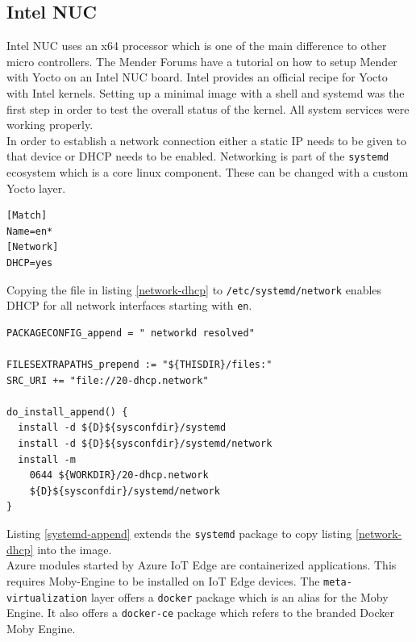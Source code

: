 \subsection{Intel NUC}
Intel NUC uses an x64 processor which is one of the main difference to other micro controllers. The Mender Forums have a tutorial on how to setup Mender with Yocto on an Intel NUC board.\cite{intel-mender-yocto} Intel provides an official recipe for Yocto with Intel kernels. Setting up a minimal image with a shell and systemd was the first step in order to test the overall status of the kernel. All system services were working properly.\\
In order to establish a network connection either a static IP needs to be given to that device or DHCP needs to be enabled. Networking is part of the \verb|systemd| ecosystem which is a core linux component. These can be changed with a custom Yocto layer.
\begin{code}
  \label{network-dhcp}
  \begin{verbatim}
[Match]
Name=en*
[Network]
DHCP=yes
  \end{verbatim}
\end{code}
Copying the file in listing \ref{network-dhcp} to \verb|/etc/systemd/network| enables DHCP for all network interfaces starting with \verb|en|.
\begin{code}
  \label{systemd-append}
  \begin{verbatim}
PACKAGECONFIG_append = " networkd resolved"

FILESEXTRAPATHS_prepend := "${THISDIR}/files:"
SRC_URI += "file://20-dhcp.network"

do_install_append() {
  install -d ${D}${sysconfdir}/systemd
  install -d ${D}${sysconfdir}/systemd/network
  install -m 
    0644 ${WORKDIR}/20-dhcp.network
    ${D}${sysconfdir}/systemd/network
}
  \end{verbatim}
\end{code}
Listing \ref{systemd-append} extends the \verb|systemd| package to copy listing \ref{network-dhcp} into the image.\\
Azure modules started by Azure IoT Edge are containerized applications. This requires Moby-Engine to be installed on IoT Edge devices. The \verb|meta-virtualization| layer offers a \verb|docker| package which is an alias for the Moby Engine. It also offers a \verb|docker-ce| package which refers to the branded Docker Moby Engine.\\
